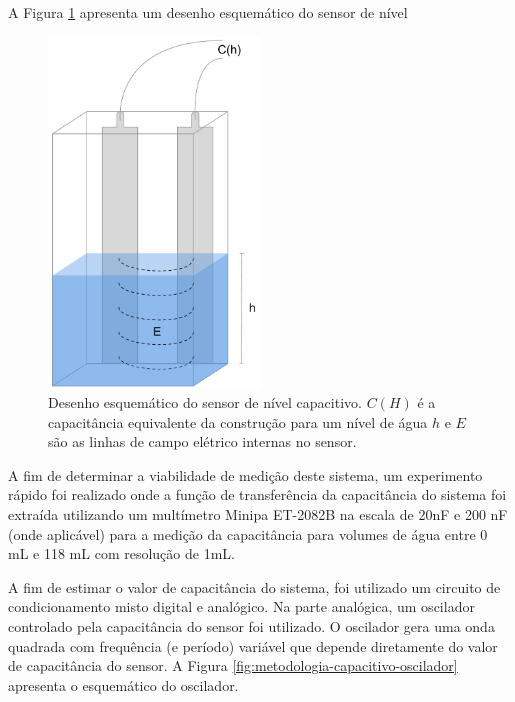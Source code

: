 \documentclass[a4paper]{instrumentacao}
\begin{document}
A Figura \ref{fig:sensor-nivel-capacitivo} apresenta um desenho esquemático do sensor de nível

\begin{figure}[H]
	\centering \includegraphics[width=0.5\textwidth]{SensorNivelCapacitivo.pdf}
	\caption{Desenho esquemático do sensor de nível capacitivo. $C(H)$ é a capacitância equivalente da construção para um nível de água $h$ e $E$ são as linhas de campo elétrico internas no sensor.}
	\label{fig:sensor-nivel-capacitivo}
\end{figure}

A fim de determinar a viabilidade de medição deste sistema, um experimento rápido foi realizado onde a função de transferência da capacitância do sistema foi extraída utilizando um multímetro Minipa ET-2082B \cite{multimetro-minipa} na escala de 20nF e 200 nF (onde aplicável) para a medição da capacitância para volumes de água entre 0 mL e 118 mL com resolução de 1mL.

A fim de estimar o valor de capacitância do sistema, foi utilizado um circuito de condicionamento misto digital e analógico. Na parte analógica, um oscilador controlado pela capacitância do sensor foi utilizado. O oscilador gera uma onda quadrada com frequência (e período) variável que depende diretamente do valor de capacitância do sensor. A Figura \ref{fig:metodologia-capacitivo-oscilador} apresenta o esquemático do oscilador.
\end{document}

